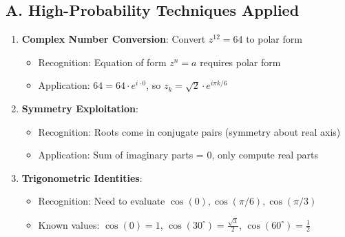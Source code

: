 \documentclass[11pt]{article}
\begin{document}
\begin{techniquesbox}
\subsection*{A. High-Probability Techniques Applied}
\begin{enumerate}[leftmargin=*]
    \item \textbf{Complex Number Conversion}: Convert $z^{12}=64$ to polar form
    \begin{itemize}
        \item Recognition: Equation of form $z^n = a$ requires polar form
        \item Application: $64 = 64 \cdot e^{i \cdot 0}$, so $z_k = \sqrt{2} \cdot e^{i\pi k/6}$
    \end{itemize}
    
    \item \textbf{Symmetry Exploitation}: 
    \begin{itemize}
        \item Recognition: Roots come in conjugate pairs (symmetry about real axis)
        \item Application: Sum of imaginary parts = 0, only compute real parts
    \end{itemize}
    
    \item \textbf{Trigonometric Identities}:
    \begin{itemize}
        \item Recognition: Need to evaluate $\cos(0), \cos(\pi/6), \cos(\pi/3)$
        \item Known values: $\cos(0)=1$, $\cos(30^\circ)=\frac{\sqrt{3}}{2}$, $\cos(60^\circ)=\frac{1}{2}$
    \end{itemize}
\end{enumerate}


\end{techniquesbox}
\end{document}
